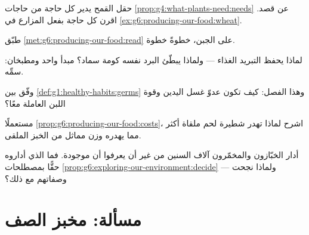 \begin{exercise}[$\star\star$]\label{exo:g6:producing-our-food:7}
حقل القمح يدير كل حاجة من حاجات
\cref{prop:g4:what-plants-need:needs} عن قصد. اقرن كل حاجة بفعل
المزارع في \cref{ex:g6:producing-our-food:wheat}.
\end{exercise}

\begin{exercise}[$\star\star$]\label{exo:g6:producing-our-food:8}
طبّق \cref{met:g6:producing-our-food:read} على الجبن، خطوةً خطوة.
\end{exercise}

\begin{exercise}[$\star\star$]\label{exo:g6:producing-our-food:9}
لماذا يحفظ التبريد الغذاء --- ولماذا يبطّئ البرد نفسه كومة سماد؟
مبدأ واحد ومطبخان: سمِّه.
\end{exercise}

\begin{exercise}[$\star\star$]\label{exo:g6:producing-our-food:10}
وفّق بين \cref{def:g1:healthy-habits:germs} وهذا الفصل: كيف تكون
 عدوّ غسل اليدين وقوة اللبن العاملة معًا؟
\end{exercise}

\begin{exercise}[$\star\star$]\label{exo:g6:producing-our-food:11}
مستعملًا \cref{prop:g6:producing-our-food:costs}، اشرح لماذا تهدر
شطيرة لحم ملقاة أكثر مما يهدره وزن مماثل من الخبز الملقى.
\end{exercise}

\begin{exercise}[$\star\star\star$]\label{exo:g6:producing-our-food:12}
أدار الخبّازون والمخمّرون  آلاف السنين من غير أن يعرفوا أن
 موجودة. فما الذي أداروه حقًّا بمصطلحات
\cref{prop:g6:exploring-our-environment:decide} --- ولماذا نجحت
وصفاتهم مع ذلك؟
\end{exercise}

\section{مسألة: مخبز الصف}

